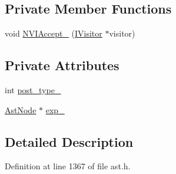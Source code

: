\subsection*{Private Member Functions}
\begin{DoxyCompactItemize}
\item 
void \hyperlink{classmocha_1_1_postfix_exp_ae33ad913b48ec2d634d0487f8f4a0d49}{NVIAccept\_\-} (\hyperlink{classmocha_1_1_i_visitor}{IVisitor} $\ast$visitor)
\end{DoxyCompactItemize}
\subsection*{Private Attributes}
\begin{DoxyCompactItemize}
\item 
int \hyperlink{classmocha_1_1_postfix_exp_a66355b77ccb183ead3421a0a515f7993}{post\_\-type\_\-}
\item 
\hyperlink{classmocha_1_1_ast_node}{AstNode} $\ast$ \hyperlink{classmocha_1_1_postfix_exp_a4be5a883b58bbd109e33cee01f666781}{exp\_\-}
\end{DoxyCompactItemize}


\subsection{Detailed Description}


Definition at line 1367 of file ast.h.



